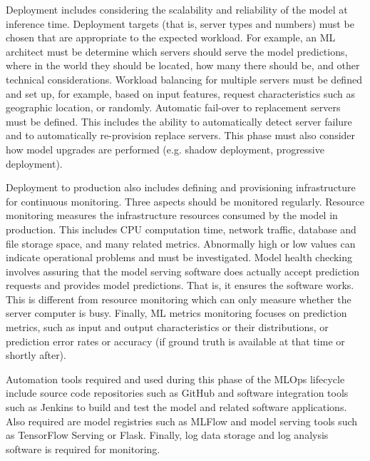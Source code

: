 Deployment includes considering the scalability and reliability of the model at inference time. Deployment targets (that is, server types and numbers) must be chosen that are appropriate to the expected workload. For example, an ML architect must be determine which servers should serve the model predictions, where in the world they should be located, how many there should be, and other technical considerations. Workload balancing for multiple servers must be defined and set up, for example, based on input features, request characteristics such as geographic location, or randomly. Automatic fail-over to replacement servers must be defined. This includes the ability to automatically detect server failure and to automatically re-provision replace servers. This phase must also consider how model upgrades are performed (e.g. shadow deployment, progressive deployment).

Deployment to production also includes defining and provisioning infrastructure for continuous monitoring. Three aspects should be monitored regularly. Resource monitoring measures the infrastructure resources consumed by the model in production. This includes CPU computation time, network traffic, database and file storage space, and many related metrics. Abnormally high or low values can indicate operational problems and must be investigated. Model health checking involves assuring that the model serving software does actually accept prediction requests and provides model predictions. That is, it ensures the software works. This is different from resource monitoring which can only measure whether the server computer is busy. Finally, ML metrics monitoring focuses on prediction metrics, such as input and output characteristics or their distributions, or prediction error rates or accuracy (if ground truth is available at that time or shortly after). 

Automation tools required and used during this phase of the MLOps lifecycle include source code repositories such as GitHub and software integration tools such as Jenkins to build and test the model and related software applications. Also required are model registries such as MLFlow and model serving tools such as TensorFlow Serving or Flask. Finally, log data storage and log analysis software is required for monitoring. 

